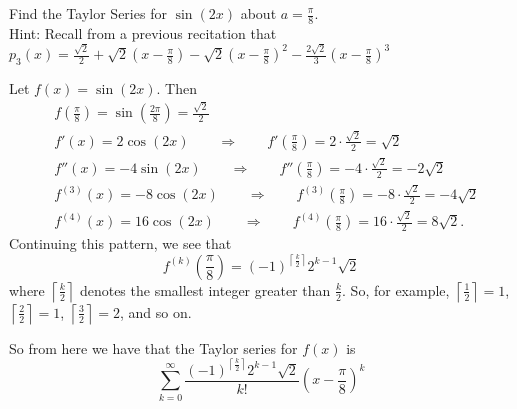 \documentclass[noinstructornotes]{ximera}
\begin{document}
\begin{problem}
 Find the Taylor Series for $\sin(2x)$ about $a = \frac{\pi}{8}$.  \\
		Hint: Recall from a previous recitation that \\
		$p_3(x) = \frac{\sqrt{2}}{2} + \sqrt{2} \left( x - \frac{\pi}{8} \right) - \sqrt{2} \left( x - \frac{\pi}{8} \right)^2 -\frac{2 \sqrt{2}}{3} \left( x - \frac{\pi}{8} \right)^3 $
\begin{freeResponse}
	Let $f(x) = \sin(2x)$.  Then
		\begin{align*}
		&f \left( \frac{\pi}{8} \right) = \sin \left( \frac{2\pi}{8} \right) = \frac{\sqrt{2}}{2}  \\
		&f'(x) = 2 \cos(2x) 	\qquad \Longrightarrow 	\qquad	f'\left( \frac{\pi}{8} \right) = 2 \cdot \frac{\sqrt{2}}{2} = \sqrt{2}  \\
		&f''(x) = -4 \sin(2x) 		\qquad	\Longrightarrow	\qquad f''\left( \frac{\pi}{8} \right) = -4 \cdot \frac{\sqrt{2}}{2} = -2 \sqrt{2}  \\
		&f^{(3)}(x) = -8 \cos(2x)	\qquad	\Longrightarrow	\qquad f^{(3)}\left( \frac{\pi}{8} \right) = -8 \cdot \frac{\sqrt{2}}{2} = -4 \sqrt{2}  \\
		&f^{(4)}(x) = 16 \cos(2x) \qquad 	\Longrightarrow	\qquad f^{(4)}\left( \frac{\pi}{8} \right) =16 \cdot \frac{\sqrt{2}}{2}  = 8 \sqrt{2}.
		\end{align*}
	Continuing this pattern, we see that
		\[
		f^{(k)} \left( \frac{\pi}{8} \right) = (-1)^{\left\lceil \frac{k}{2} \right\rceil } 2^{k-1} \sqrt{2}
		\]
	where $\left\lceil \frac{k}{2} \right\rceil$ denotes the smallest integer greater than $\frac{k}{2}$.  
	So, for example, $\left\lceil \frac{1}{2} \right\rceil = 1$, $\left\lceil \frac{2}{2} \right\rceil = 1$, $\left\lceil \frac{3}{2} \right\rceil = 2$, and so on.  
	
	So from here we have that the Taylor series for $f(x)$ is
		\[
		\boxed{\sum_{k=0}^\infty \frac{(-1)^{\left\lceil \frac{k}{2} \right\rceil } 2^{k-1} \sqrt{2}}{k!} \left( x - \frac{\pi}{8} \right)^k}
		\]
\end{freeResponse}

\end{problem}












	
	
	
	
	
	
	
	
	

	










								
				
				
	
\end{document}
